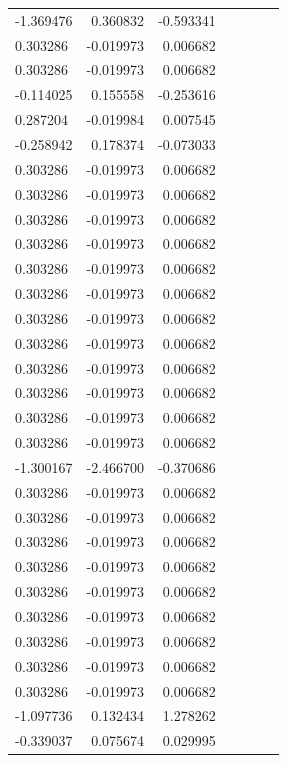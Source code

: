 \documentclass[a4paper,twoside,12pt]{book}
\begin{document}
\begin{appendices}
\begin{table}
\begin{tabular}{lrrrrrr}
	-1.369476 &  0.360832 & -0.593341 \\
	 0.303286 & -0.019973 &  0.006682 \\
	 0.303286 & -0.019973 &  0.006682 \\
	-0.114025 &  0.155558 & -0.253616 \\
	 0.287204 & -0.019984 &  0.007545 \\
	-0.258942 &  0.178374 & -0.073033 \\
	 0.303286 & -0.019973 &  0.006682 \\
	 0.303286 & -0.019973 &  0.006682 \\
	 0.303286 & -0.019973 &  0.006682 \\
	 0.303286 & -0.019973 &  0.006682 \\
	 0.303286 & -0.019973 &  0.006682 \\
	 0.303286 & -0.019973 &  0.006682 \\
	 0.303286 & -0.019973 &  0.006682 \\
	 0.303286 & -0.019973 &  0.006682 \\
	 0.303286 & -0.019973 &  0.006682 \\
	 0.303286 & -0.019973 &  0.006682 \\
	 0.303286 & -0.019973 &  0.006682 \\
	 0.303286 & -0.019973 &  0.006682 \\
	-1.300167 & -2.466700 & -0.370686 \\
	 0.303286 & -0.019973 &  0.006682 \\
	 0.303286 & -0.019973 &  0.006682 \\
	 0.303286 & -0.019973 &  0.006682 \\
	 0.303286 & -0.019973 &  0.006682 \\
	 0.303286 & -0.019973 &  0.006682 \\
	 0.303286 & -0.019973 &  0.006682 \\
	 0.303286 & -0.019973 &  0.006682 \\
	 0.303286 & -0.019973 &  0.006682 \\
	 0.303286 & -0.019973 &  0.006682 \\
	-1.097736 &  0.132434 &  1.278262 \\
	-0.339037 &  0.075674 &  0.029995 \\
	\bottomrule
	\end{tabular}		
\end{table}
\begin{table}
	\centering
	\begin{tabular}{lrrrrrr}
		\toprule

\end{tabular}
\end{table}
\end{appendices}
\end{document}
